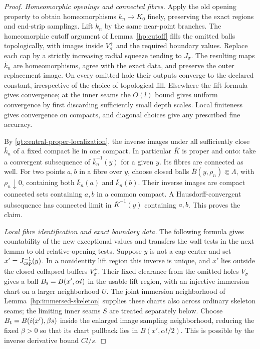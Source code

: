 \documentclass[11pt]{article}
\numberwithin{equation}{section}
\theoremstyle{definition}
\theoremstyle{remark}
\begin{document}
\begin{proof}
\emph{Homeomorphic openings and connected fibres.}
Apply the old opening property to
obtain homeomorphisms $k_n\to K_0$ finely, preserving the exact
regions and end-strip samplings.  Lift $k_n$ by the same near-point
branches.  The homeomorphic cutoff argument of
Lemma~\ref{hp:cutoff} fills the omitted balls topologically, with
images inside $V_{\sigma}^+$ and the required boundary values.  Replace
each cap by a strictly increasing radial squeeze tending to $J_{\sigma}$.
The resulting maps $\bar k_n$ are homeomorphisms, agree with the
exact data, and preserve the outer replacement image.
On every omitted hole their outputs converge to the declared
constant, irrespective of the choice of topological fill.  Elsewhere
the lift formula gives convergence; at the inner seams the $O(l)$
bound gives uniform convergence by first discarding sufficiently
small depth scales.  Local finiteness gives convergence on compacts,
and diagonal choices give any prescribed fine accuracy.

By \eqref{qt:central-proper-localization}, the inverse images under
all sufficiently close $\bar k_n$ of a fixed compact lie in one
compact.  In particular $\overline K$ is proper and onto: take a
convergent subsequence of $\bar k_n^{-1}(y)$ for a given $y$.
Its fibres are connected as well.  For two points $a,b$ in a fibre
over $y$, choose closed balls $\overline B(y,\rho_n)\Subset\Lambda$,
with $\rho_n\downarrow0$, containing both $\bar k_n(a)$ and
$\bar k_n(b)$.  Their inverse images are compact connected sets
containing $a,b$ in a common compact.  A Hausdorff-convergent
subsequence has connected limit in $\overline K^{-1}(y)$ containing
$a,b$.  This proves the claim.

\emph{Local fibre identification and exact boundary data.}
The following formula gives countability of the new exceptional
values and transfers the wall tests in the next lemma to old
relative-opening tests.  Suppose $y$ is not a cap center and set
$x'=J_{\rm cap}^{-1}(y)$.  In a nonidentity lift region this inverse
is unique, and $x'$ lies outside the closed collapsed buffers
$V_\sigma^+$.  Their fixed clearance from the omitted holes
$V_\sigma$ gives a ball
$B_{\rm s}=B(x',\alpha l)$ in the usable lift region, with an
injective immersion chart on a larger neighborhood $U$.  The joint
immersion neighborhood of Lemma~\ref{hp:immersed-skeleton} supplies
these charts also across ordinary skeleton seams; the limiting inner
seams $S$ are treated separately below.  Choose
$B_{\rm t}=B(i(x'),\beta s)$ inside the enlarged image sampling
neighborhood, reducing the fixed $\beta>0$ so that its chart
pullback lies in $B(x',\alpha l/2)$.  This is possible by the
inverse derivative bound $C l/s$.


\end{proof}
\end{document}
